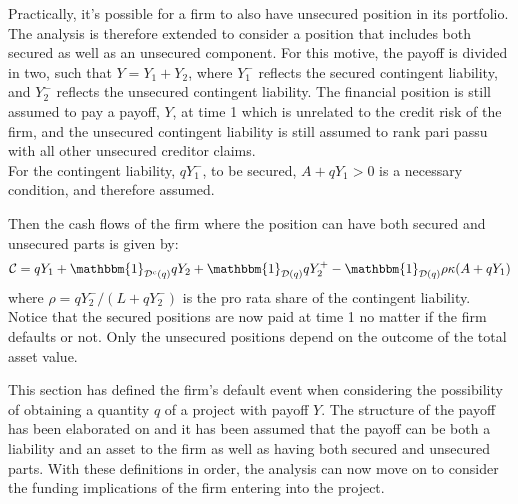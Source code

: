 \documentclass[../main.tex]{subfiles}
\begin{document}
        Practically, it's possible for a firm to also have unsecured position in its portfolio.
        The analysis is therefore extended to consider a position that includes both secured as well as an unsecured component.
        For this motive, the payoff is divided in two, such that $Y=Y_1 + Y_2$, where $Y_1^{-}$ reflects the secured contingent liability, and $Y_2^{-}$ reflects the unsecured contingent liability.
        The financial position is still assumed to pay a payoff, $Y$, at time 1 which is unrelated to the credit risk of the firm, and the unsecured contingent liability is still assumed to rank pari passu with all other unsecured creditor claims.\\
        For the contingent liability, $qY_1^{-}$, to be secured, $A+qY_1 > 0$ is a necessary condition, and therefore assumed.

        Then the cash flows of the firm where the position 
        can have both secured and unsecured parts is given by:
        \begin{equation}
            \mathcal{C} =
                q Y_{1}
                + \mathbbm{1}_{\mathcal{D}^{c}(q)} qY_{2}
                + \mathbbm{1}_{\mathcal{D}(q)} qY_{2}^{+}
                - \mathbbm{1}_{\mathcal{D}(q)} \rho\kappa (A + qY_{1})
        \end{equation}
        where $\rho = qY_{2}^{-}/(L + qY_{2}^{-})$ is the pro rata share of the contingent liability. 
        Notice that the secured positions are now paid at time 1 no matter if the firm defaults or not. 
        Only the unsecured positions depend on the outcome of the total asset value.

        This section has defined the firm's default event when considering the possibility
        of obtaining a quantity $q$ of a project with payoff $Y$.
        The structure of the payoff has been elaborated on
        and it has been assumed that the payoff can be both a liability and an asset to the firm
        as well as having both secured and unsecured parts.
        With these definitions in order, the analysis can now move on to consider the
        funding implications of the firm entering into the project.
        
\end{document}
